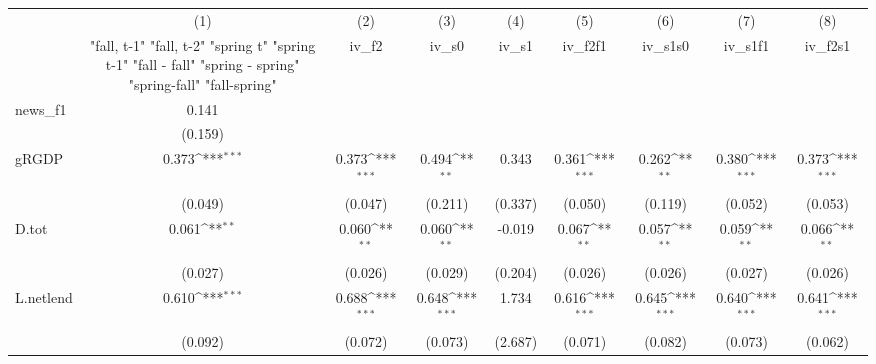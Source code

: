 {
\def\sym#1{\ifmmode^{#1}\else\(^{#1}\)\fi}
\begin{tabular}{l*{8}{c}}
\toprule
            &\multicolumn{1}{c}{(1)}&\multicolumn{1}{c}{(2)}&\multicolumn{1}{c}{(3)}&\multicolumn{1}{c}{(4)}&\multicolumn{1}{c}{(5)}&\multicolumn{1}{c}{(6)}&\multicolumn{1}{c}{(7)}&\multicolumn{1}{c}{(8)}\\
            &\multicolumn{1}{c}{  "fall, t-1" "fall, t-2" "spring t" "spring t-1"  "fall - fall" "spring - spring" "spring-fall" "fall-spring" }&\multicolumn{1}{c}{iv\_f2}&\multicolumn{1}{c}{iv\_s0}&\multicolumn{1}{c}{iv\_s1}&\multicolumn{1}{c}{iv\_f2f1}&\multicolumn{1}{c}{iv\_s1s0}&\multicolumn{1}{c}{iv\_s1f1}&\multicolumn{1}{c}{iv\_f2s1}\\
\midrule
news\_f1     &       0.141         &                     &                     &                     &                     &                     &                     &                     \\
            &     (0.159)         &                     &                     &                     &                     &                     &                     &                     \\
\addlinespace
gRGDP       &       0.373\sym{***}&       0.373\sym{***}&       0.494\sym{**} &       0.343         &       0.361\sym{***}&       0.262\sym{**} &       0.380\sym{***}&       0.373\sym{***}\\
            &     (0.049)         &     (0.047)         &     (0.211)         &     (0.337)         &     (0.050)         &     (0.119)         &     (0.052)         &     (0.053)         \\
\addlinespace
D.tot       &       0.061\sym{**} &       0.060\sym{**} &       0.060\sym{**} &      -0.019         &       0.067\sym{**} &       0.057\sym{**} &       0.059\sym{**} &       0.066\sym{**} \\
            &     (0.027)         &     (0.026)         &     (0.029)         &     (0.204)         &     (0.026)         &     (0.026)         &     (0.027)         &     (0.026)         \\
\addlinespace
L.netlend   &       0.610\sym{***}&       0.688\sym{***}&       0.648\sym{***}&       1.734         &       0.616\sym{***}&       0.645\sym{***}&       0.640\sym{***}&       0.641\sym{***}\\
            &     (0.092)         &     (0.072)         &     (0.073)         &     (2.687)         &     (0.071)         &     (0.082)         &     (0.073)         &     (0.062)         \\

\end{tabular}}
